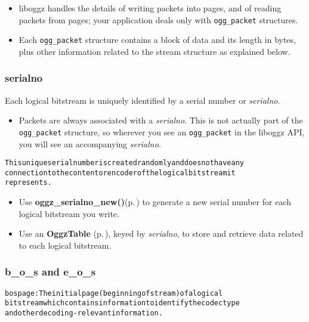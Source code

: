 \begin{itemize}
\item liboggz handles the details of writing packets into pages, and of reading packets from pages; your application deals only with {\tt ogg\_\-packet} structures.\item Each {\tt ogg\_\-packet} structure contains a block of data and its length in bytes, plus other information related to the stream structure as explained below.\end{itemize}
\subsubsection{serialno}\label{serialno}
Each logical bitstream is uniquely identified by a serial number or {\em serialno\/}.

\begin{itemize}
\item Packets are always associated with a {\em serialno\/}. This is not actually part of the {\tt ogg\_\-packet} structure, so wherever you see an {\tt ogg\_\-packet} in the liboggz API, you will see an accompanying {\em serialno\/}.\end{itemize}


\small\begin{alltt}
   This unique serial number is created randomly and does not have any
   connection to the content or encoder of the logical bitstream it
   represents.
\end{alltt}\normalsize 


\begin{itemize}
\item Use {\bf oggz\_\-serialno\_\-new()}{\rm (p.\,\pageref{oggz_8h_a25})} to generate a new serial number for each logical bitstream you write.\item Use an {\bf Oggz\-Table }{\rm (p.\,\pageref{oggz__table_8h})}, keyed by {\em serialno\/}, to store and retrieve data related to each logical bitstream.\end{itemize}
\subsubsection{b\_\-o\_\-s and e\_\-o\_\-s}\label{boseos}
\small\begin{alltt}
   bos page: The initial page (beginning of stream) of a logical
      bitstream which contains information to identify the codec type
      and other decoding-relevant information.\end{alltt}\normalsize 



